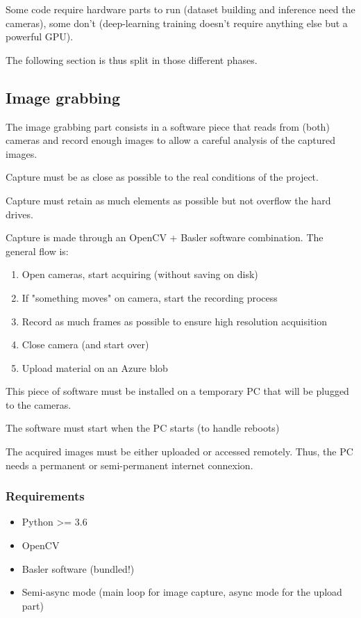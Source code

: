 Some code require hardware parts to run (dataset building and inference need the cameras), some don't
(deep-learning training doesn't require anything else but a powerful GPU).

The following section is thus split in those different phases.

\subsection{Image grabbing}

The image grabbing part consists in a software piece that reads from (both) cameras and record enough images to
allow a careful analysis of the captured images.

Capture must be as close as possible to the real conditions of the project.

Capture must retain as much elements as possible but not overflow the hard drives.

Capture is made through an OpenCV + Basler software combination. The general flow is:

\begin{enumerate}
    \item Open cameras, start acquiring (without saving on disk)
    \item If "something moves" on camera, start the recording process
    \item Record as much frames as possible to ensure high resolution acquisition
    \item Close camera (and start over)
    \item Upload material on an Azure blob
\end{enumerate}

This piece of software must be installed on a temporary PC that will be plugged to the cameras.

The software must start when the PC starts (to handle reboots)

The acquired images must be either uploaded or accessed remotely. Thus, the PC needs a permanent or semi-permanent internet connexion.

\subsubsection{Requirements}

\begin{itemize}
    \item Python >= 3.6
    \item OpenCV
    \item Basler software (bundled!)
    \item Semi-async mode (main loop for image capture, async mode for the upload part)
\end{itemize}

